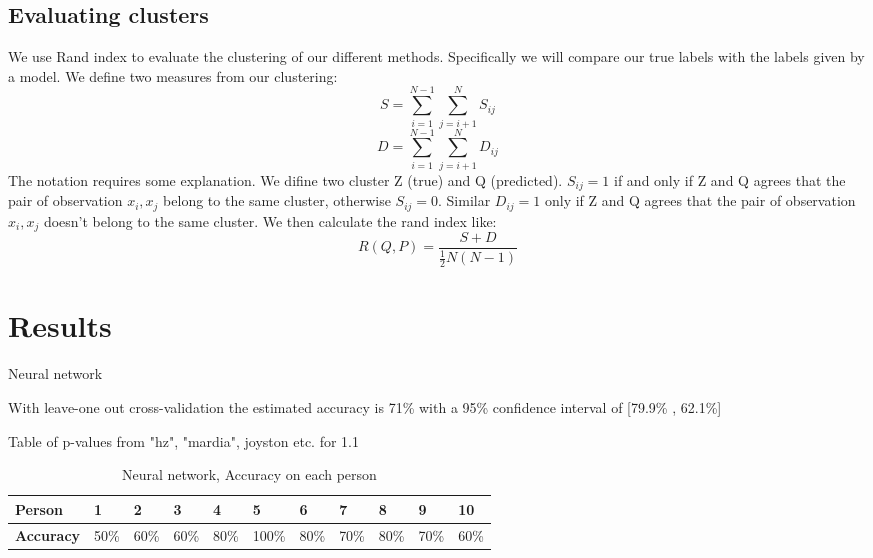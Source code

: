 \documentclass{article}
\begin{document}


\subsection*{Evaluating clusters}
We use Rand index to evaluate the clustering of our different methods. Specifically we will compare our true labels with the labels given by a model.
We define two measures from our clustering:
\begin{equation}
S=\sum_{i=1}^{N-1} \sum_{j=i+1}^{N} S_{i j}
\end{equation}
\begin{equation}
D=\sum_{i=1}^{N-1} \sum_{j=i+1}^{N} D_{i j}
\end{equation}
The notation requires some explanation. We difine two cluster Z (true) and Q (predicted). $S_{ij} = 1$ if and only if  Z and Q agrees that the pair of observation ${x_i,x_j}$ belong to the same cluster, otherwise $S_{ij} = 0$. Similar  $D_{ij} = 1$ only if Z and Q agrees that the pair of observation ${x_i,x_j}$ doesn't belong to the same cluster. 
We then calculate the rand index like:
\begin{equation}
R(Q, P)=\frac{S+D}{\frac{1}{2} N(N-1)}
\end{equation}

\section{Results}

Neural network

With leave-one out cross-validation the estimated accuracy is 71\% with a 95\% confidence interval of  [79.9\% , 62.1\%]

Table of p-values from "hz", "mardia", joyston etc. for 1.1

\begin{table}[H]
\begin{tabular}{lllllllllll}
\hline
\textbf{Person}   & 1                        & 2                        & 3    & 4    & 5     & 6    & 7    & 8    & 9    & 10   \\ \hline
\textbf{Accuracy} & \multicolumn{1}{c}{50\%} & \multicolumn{1}{c}{60\%} & 60\% & 80\% & 100\% & 80\% & 70\% & 80\% & 70\% & 60\% \\ \hline
\end{tabular}
\caption{Neural network, Accuracy on each person}
\label{tab:nn}
\end{table}
\end{document}
